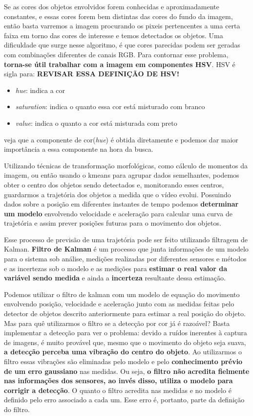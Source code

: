 \documentclass[journal]{IEEEtran}
\begin{document}
Se as cores dos objetos envolvidos forem conhecidas e aproximadamente 
constantes, e essas cores forem bem distintas das cores do fundo da 
imagem, então basta varremos a imagem procurando os pixeis 
pertencentes a uma certa faixa em torno das cores de interesse e 
temos detectados os objetos.
Uma dificuldade que surge nesse algoritmo, é que cores parecidas podem
ser geradas com combinações diferentes de canais RGB. Para contornar 
esse problema, \textbf{torna-se
útil trabalhar com a imagem em componentes HSV}. HSV é sigla para:
\textbf{REVISAR ESSA DEFINIÇÃO DE HSV!}
\begin{itemize}
 \item 
 \textit{hue}: indica a cor
 \item 
 \textit{saturation}: indica o quanto essa cor está misturado com 
branco
 \item
 \textit{value}: indica o quanto a cor está misturada com preto
\end{itemize}
veja que a componente de cor(\textit{hue}) é obtida diretamente e 
podemos dar maior importância a essa componente na hora da busca.


Utilizando técnicas de transformação morfológicas, como cálculo de 
momentos da imagem, ou então usando o kmeans para agrupar dados 
semelhantes, podemos obter o centro dos objetos sendo detectados e,
monitorando esses centros, guardarmos a trajetória dos objetos a 
medida que o vídeo evolui. Possuindo dados sobre a posição em 
diferentes instantes de tempo podemos \textbf{determinar um modelo} 
envolvendo velocidade e aceleração para calcular uma curva de 
trajetória e assim prever posições futuras para o movimento dos 
objetos.

Esse processo de previsão de uma trajetória pode ser feito utilizando
filtragem de Kalman. \textbf{Filtro de Kalman} é um processo que 
junta informações de um modelo para o sistema sob análise, medições 
realizadas por diferentes sensores e métodos e as incertezas sob o 
modelo e as medições para \textbf{estimar o real valor da variável 
sendo 
medida} e ainda a \textbf{incerteza} resultante dessa estimação.

Podemos
utilizar o filtro de kalman com um modelo de equação do movimento 
envolvendo posição, velocidade e aceleração junto com as medidas 
feitas pelo detector de objetos descrito anteriormente para estimar a 
real posição do objeto. Mas para quê 
utilizarmos o filtro se a detecção por cor já é razoável? Basta 
implementar a detecção para ver o problema: devido a ruídos inerentes
à captura de imagens, é muito provável que, mesmo que o movimento do 
objeto seja suava, \textbf{a detecção perceba uma vibração do centro 
do 
objeto}. Ao utilizarmos o filtro essas vibrações são eliminadas pelo 
modelo e pelo \textbf{conhecimento prévio de um erro gaussiano} nas 
medidas.
Ou seja, \textbf{o filtro não acredita fielmente nas informações dos 
sensores,
ao invés disso, utiliza o modelo para corrigir a detecção}. O quanto 
o filtro acredita nas medidas e no modelo é definido pelo erro 
associado a cada um. Esse erro é, portanto, parte da definição do 
filtro.
\end{document}
